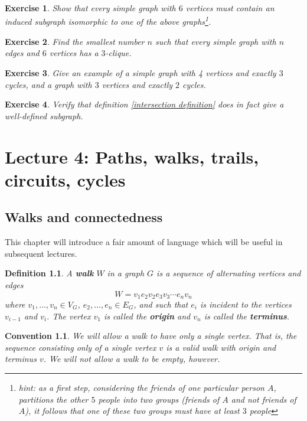 \documentclass[12pt]{report}
\theoremstyle{plain}
\newtheorem{defn}[thm]{Definition}
\newtheorem{convention}[thm]{Convention}
\newtheorem{exercise}{Exercise}[section]
\newcommand{\Xb}[1]{\textbf{#1}\index{#1}}
\begin{document}
\begin{exercise}
Show that every simple graph with $6$ vertices must contain an induced
subgraph isomorphic to one of the above graphs\footnote{hint: as a first
step, considering
the friends of one particular person $A$, partitions the other $5$ people into
two groups (friends of $A$ and not friends of $A$), it follows that one of
these two groups must have at least $3$ people}.
\end{exercise}

\begin{exercise} \label{ramsey 6}
Find the smallest number $n$ such that every simple graph with $n$ edges
and $6$ vertices has a $3$-clique.
\end{exercise}

\begin{exercise}
Give an example of a simple graph with 4 vertices and exactly $3$ cycles, and a
graph with $3$ vertices and exactly $2$ cycles.
\end{exercise}

\begin{exercise}
Verify that definition \ref{intersection definition} does in fact give a
well-defined subgraph.
\end{exercise}



\chapter{Lecture 4: Paths, walks, trails, circuits, cycles}

\section{Walks and connectedness}

This chapter will introduce a fair amount of language which will be useful
in subsequent lectures. 

\begin{defn}
A \Xb{walk} $W$ in a graph $G$ is a sequence of alternating vertices and
edges
\[ W = v_1 e_2 v_2 e_3 v_3 \cdots e_n v_n \]
where $v_1, \ldots, v_n \in V_G$, $e_2, \ldots, e_n \in E_G$, and such that
$e_i$ is incident to the vertices $v_{i-1}$ and $v_i$. The vertex $v_1$ is
called the \textbf{origin} and $v_n$ is called
the \textbf{terminus}.
\end{defn}

\begin{convention}
We will allow a walk to have only a single vertex. That is, the sequence
consisting only of a single vertex $v$ is a valid walk with origin and
terminus $v$. We will not allow a walk to be empty, however.
\end{convention}
\end{document}
